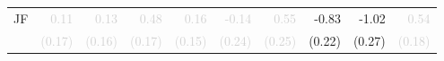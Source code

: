 \begin{tabular}{lrrrrrrrrr}
\multirow{2}{*}{JF} &\textcolor{LightGray}{0.11} &\textcolor{LightGray}{0.13} &\textcolor{LightGray}{0.48} &\textcolor{LightGray}{0.16} &\textcolor{LightGray}{-0.14} &\textcolor{LightGray}{0.55} &-0.83 &-1.02 &\cellcolor{Gray}\textcolor{LightGray}{0.54}\\
 &\textcolor{LightGray}{\tiny{(0.17)}} &\textcolor{LightGray}{\tiny{(0.16)}} &\textcolor{LightGray}{\tiny{(0.17)}} &\textcolor{LightGray}{\tiny{(0.15)}} &\textcolor{LightGray}{\tiny{(0.24)}} &\textcolor{LightGray}{\tiny{(0.25)}} &\tiny{(0.22)} &\tiny{(0.27)} &\cellcolor{Gray}\textcolor{LightGray}{\tiny{(0.18)}}\\[1ex]
\bottomrule
\end{tabular}
